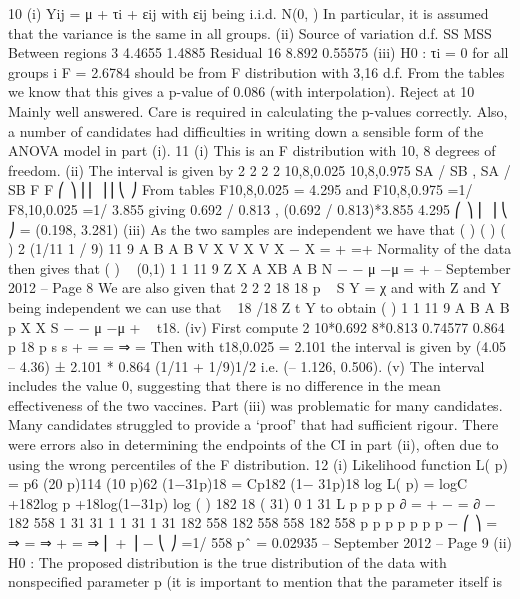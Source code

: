 \documentclass[a4paper,12pt]{article}
\begin{document}
\begin{enumerate}
  10 (i) Yij = μ + τi + εij
with εij being i.i.d. N(0,  )
In particular, it is assumed that the variance is the same in all groups.
(ii)
Source of variation d.f. SS MSS
Between regions 3 4.4655 1.4885
Residual 16 8.892 0.55575
(iii) H0 : τi = 0 for all groups i
F = 2.6784 should be from F distribution with 3,16 d.f.
From the tables we know that this gives a p-value of 0.086 (with
                                                            interpolation).
Reject at 10%
Mainly well answered. Care is required in calculating the p-values correctly. Also, a number
of candidates had difficulties in writing down a sensible form of the ANOVA model in part (i).
11 (i) This is an F distribution with 10, 8 degrees of freedom.
(ii) The interval is given by
2 2 2 2
10,8,0.025 10,8,0.975
SA / SB , SA / SB
F F
⎛ ⎞
⎜⎜ ⎟⎟
⎝ ⎠
From tables F10,8,0.025 = 4.295 and F10,8,0.975 =1/ F8,10,0.025 =1/ 3.855
giving 0.692 / 0.813 , (0.692 / 0.813)*3.855
4.295
⎛ ⎞
⎜ ⎟
⎝ ⎠
= (0.198, 3.281)
(iii) As the two samples are independent we have that
( ) ( ) ( ) 2 (1/11 1 / 9)
11 9
A B
A B
V X V X
V X − X = + =\sigma +
  Normality of the data then gives that ( ) ~ (0,1)
1 1
11 9
Z X A XB A B N
− − μ −μ
=
  \sigma +
   – September 2012 – %
Page 8
We are also given that
2
2
2 18
18
p ~ S
Y = χ
\sigma
and with Z and Y being independent
we can use that ~ 18
/18
Z t
Y
to obtain ( )
1 1
11 9
A B A B
p
X X
S
− − μ −μ
+
  ~ t18.
(iv) First compute 2 10*0.692 8*0.813 0.74577 0.864
p 18 p s s +
  = = ⇒ =
  Then with t18,0.025 = 2.101 the interval is given by (4.05 – 4.36) ± 2.101 *
  0.864 (1/11 + 1/9)1/2 i.e. (– 1.126, 0.506).
(v) The interval includes the value 0, suggesting that there is no difference in the
mean effectiveness of the two vaccines.
Part (iii) was problematic for many candidates. Many candidates struggled to provide a
‘proof’ that had sufficient rigour. There were errors also in determining the endpoints of the
CI in part (ii), often due to using the wrong percentiles of the F distribution.
12 (i) Likelihood function
L( p) = p6 (20 p)114 (10 p)62 (1−31p)18 = Cp182 (1− 31p)18
log L( p) = logC +182log p +18log(1−31p)
log ( ) 182 18 ( 31) 0
1 31
L p
p p p
∂
= + − =
  ∂ −
182 558 1 31 31 1 1 31
1 31 182 558 182 558 558 182 558
p p p p p
p p
− ⎛ ⎞ = ⇒ = ⇒ + = ⇒ ⎜ + ⎟ − ⎝ ⎠
=1/ 558
pˆ = 0.02935
 – September 2012 – %
Page 9
(ii) H0 : The proposed distribution is the true distribution of the data with nonspecified
parameter p (it is important to mention that the parameter itself is

\end{enumerate}
\end{document}

